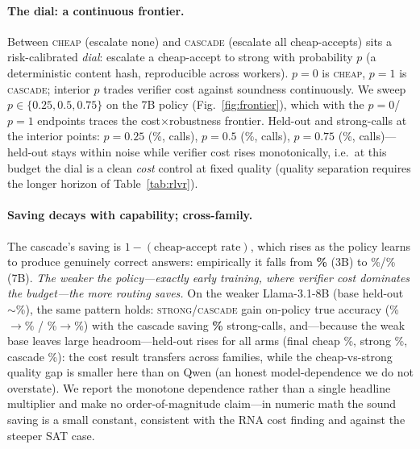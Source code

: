 \paragraph{The dial: a continuous frontier.} Between \textsc{cheap} (escalate none) and \textsc{cascade}
(escalate all cheap-accepts) sits a risk-calibrated \emph{dial}: escalate a cheap-accept to strong with
probability $p$ (a deterministic content hash, reproducible across workers). $p{=}0$ is \textsc{cheap},
$p{=}1$ is \textsc{cascade}; interior $p$ trades verifier cost against soundness continuously. We sweep
$p\in\{0.25,0.5,0.75\}$ on the 7B policy (Fig.~\ref{fig:frontier}), which with the $p{=}0$/$p{=}1$ endpoints
traces the cost$\times$robustness frontier. Held-out and strong-calls at the interior points:
$p{=}0.25$ (\dialTwentyFiveHoFinal\%, \dialTwentyFiveStrongCalls{} calls),
$p{=}0.5$ (\dialFiftyHoFinal\%, \dialFiftyStrongCalls{} calls),
$p{=}0.75$ (\dialSeventyFiveHoFinal\%, \dialSeventyFiveStrongCalls{} calls)---held-out stays within noise
while verifier cost rises monotonically, i.e.\ at this budget the dial is a clean \emph{cost} control at
fixed quality (quality separation requires the longer horizon of Table~\ref{tab:rlvr}).

\paragraph{Saving decays with capability; cross-family.} The cascade's saving is $1-(\text{cheap-accept
rate})$, which rises as the policy learns to produce genuinely correct answers: empirically it falls from
\textbf{\threeBSavings\%} (3B) to \mSevenBSavings\%/\longSavings\% (7B). \emph{The weaker the policy---exactly
early training, where verifier cost dominates the budget---the more routing saves.} On the weaker
Llama-3.1-8B (base held-out $\sim$\llamaStrongHoBase\%), the same pattern holds: \textsc{strong}/\textsc{cascade}
gain on-policy true accuracy (\llamaStrongAccStart\%$\to$\llamaStrongAccEnd\% /
\llamaCascadeAccStart\%$\to$\llamaCascadeAccEnd\%) with the cascade saving \textbf{\llamaSavings\%} strong-calls,
and---because the weak base leaves large headroom---held-out rises for all arms (final
cheap \llamaCheapHoFinal\%, strong \llamaStrongHoFinal\%, cascade \llamaCascadeHoFinal\%): the cost result
transfers across families, while the cheap-vs-strong quality gap is smaller here than on Qwen (an honest
model-dependence we do not overstate). We report the monotone dependence rather than a
single headline multiplier and make no order-of-magnitude claim---in numeric math the sound saving is a small
constant, consistent with the RNA cost finding and against the steeper SAT case.

